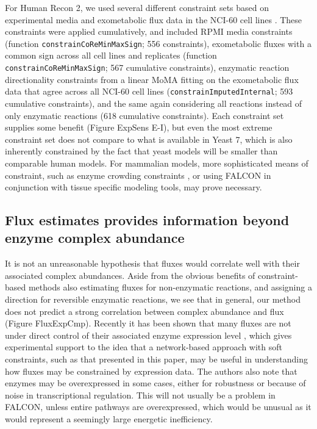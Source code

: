 For Human Recon 2, we used several different constraint sets based on
experimental media and exometabolic flux data in the NCI-60 cell lines
\citep{Jain2012}. These constraints were applied cumulatively, and
included RPMI media constraints (function
\texttt{constrainCoReMinMaxSign}; 556 constraints), exometabolic
fluxes with a common sign across all cell lines and replicates
(function \texttt{constrainCoReMinMaxSign}; 567 cumulative
constraints), enzymatic reaction directionality constraints from a
linear MoMA fitting on the exometabolic flux data that agree
across all NCI-60 cell lines (\texttt{constrainImputedInternal}; 593
cumulative constraints), and the same again considering all reactions
instead of only enzymatic reactions (618 cumulative constraints). Each
constraint set supplies some benefit (Figure ExpSens E-I), but even
the most extreme constraint set does not compare to what is available
in Yeast 7, which is also inherently constrained by the fact that
yeast models will be smaller than comparable human models.  For
mammalian models, more sophisticated means of constraint, such as
enzyme crowding constraints \citep{Shlomi2011}, or using FALCON in
conjunction with tissue specific modeling tools, may prove necessary.

\subsection{Flux estimates provides information beyond enzyme complex abundance}
It is not an unreasonable hypothesis that fluxes would correlate well
with their associated complex abundances. Aside from the obvious benefits
of constraint-based methods also estimating fluxes for non-enzymatic
reactions, and assigning a direction for reversible enzymatic
reactions, we see that in general, our method does not predict a
strong correlation between complex abundance and flux
(Figure FluxExpCmp). Recently it has been shown that many fluxes are not
under direct control of their associated enzyme expression
level \citep{Chubukov2013}, which gives experimental support to the
idea that a network-based approach with soft constraints, such as that
presented in this paper, may be useful in understanding how fluxes may
be constrained by expression data. The authors also note that enzymes
may be overexpressed in some cases, either for robustness or because
of noise in transcriptional regulation. This will not usually be a
problem in FALCON, unless entire pathways are overexpressed, which
would be unusual as it would represent a seemingly large energetic
inefficiency.

